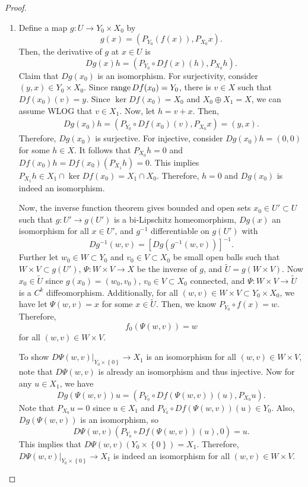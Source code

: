 \documentclass[a4paper]{article}
\begin{document}
\begin{proof}
{
\newcommand{\py}{{P_{Y_0}}}
\newcommand{\pyy}{{P_{Y_1}}}
\newcommand{\px}{{P_{X_0}}}
\newcommand{\pxx}{{P_{X_1}}}
\begin{enumerate}
\item Define a map $g: U \to Y_0 \times X_0$ by 
\[
g(x) = \left( P_{Y_0}(f(x)), P_{X_0}x \right).
\]
Then, the derivative of $g$ at $x \in U$ is 
\[
Dg(x) h = (P_{Y_0} \circ Df(x) (h), P_{X_0} h).
\]
Claim that $Dg(x_0)$ is an isomorphism. For surjectivity, 
consider $(y, x) \in Y_0 \times X_0$. Since $\operatorname{range} Df(x_0) = Y_0$,
there is $v \in X$ such that $Df(x_0) (v) = y$. 
Since $\ker Df(x_0) = X_0$ and $X_0 \oplus X_1 = X$, 
we can assume WLOG 
that $v \in X_1$. Now, let $h = v + x$. Then,
\[
\begin{aligned}
Dg(x_0) h 
= (\py \circ Df(x_0) (v) , \px x) 
= (y, x).
\end{aligned}
\]
Therefore, $Dg(x_0)$ is surjective. For injective, consider 
$Dg(x_0) h = (0, 0)$ for some $h \in X$. It follows that 
$\px h = 0$ and $Df(x_0) h = Df(x_0) (\pxx h) = 0$. 
This implies $\pxx h \in X_1 \cap \ker Df(x_0) = X_1 \cap X_0$.
Therefore, $h = 0$ and $Dg(x_0)$ is indeed an isomorphism.

Now, the inverse function theorem gives bounded and open sets 
$x_0 \in U' \subset U$ such that $g: U' \to 
g(U')$ is a bi-Lipschitz homeomorphism, $Dg(x)$ an 
isomorphism for all $x \in U'$, and $g^{-1}$ differentiable 
on $g(U')$ with 
\[
Dg^{-1}(w, v) = [Dg(g^{-1}(w, v))]^{-1}.
\]
Further let $w_0 \in W \subset Y_0$ and 
$v_0 \in V \subset X_0$ be small open balls such
that $W \times V \subset g(U')$, 
$\Psi: W \times V \to X$ be the inverse of $g$, and 
$\tilde{U} = g(W \times V)$. 
Now $x_0 \in \tilde{U}$ since $g(x_0) = (w_0, v_0)$,
$v_0 \in V \subset X_0$ connected, and
$\Psi : W \times V \to \tilde{U}$
is a $C^k$ diffeomorphism.
Additionally, for all $(w, v) \in W \times V \subset Y_0 \times X_0$,
we have let $\Psi(w, v) = x$ for some $x \in \tilde{U}$. Then, we 
know $\py \circ f(x) = w$. Therefore, 
\[
f_0(\Psi(w, v)) = w 
\]
for all $(w, v) \in W \times V$.

To show $D \Psi(w, v) \vert_{Y_0 \times \left\{ 0 \right\}} \to X_1$
is an isomorphism for all $(w,v) \in W \times V$, 
note that $D\Psi(w,v)$ is already an 
isomorphism and thus injective. Now for any $u \in X_1$, 
we have 
\[
Dg(\Psi(w, v))u = (\py \circ Df(\Psi(w, v))(u), \px u).
\]
Note that $\px u = 0$ since $u \in X_1$ and 
$\py \circ Df(\Psi(w, v))(u) \in Y_0$. 
Also, $Dg(\Psi(w, v))$
is an isomorphism, so 
\[
D\Psi(w, v) (\py \circ Df(\Psi(w, v))(u), 0) = u.
\]
This implies  
that $D\Psi(w, v) (Y_0 \times \left\{ 0 \right\}) = X_1$.
Therefore, $D \Psi(w, v) \vert_{Y_0 \times \left\{ 0 \right\}} \to X_1$
is indeed an isomorphism for all $(w,v) \in W \times V$.


\end{enumerate}}
\end{proof}
\end{document}
